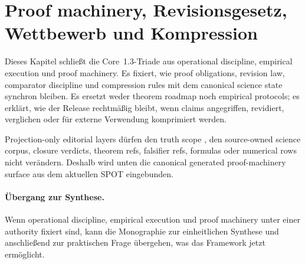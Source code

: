 \section{Proof machinery, Revisionsgesetz, Wettbewerb und Kompression}
\label{sec:oc-core-1-3-proof-machinery-de}

Dieses Kapitel schließt die Core~1.3-Triade aus operational discipline,
empirical execution und proof machinery. Es fixiert, wie proof obligations,
revision law, comparator discipline und compression rules mit dem canonical
science state synchron bleiben. Es ersetzt weder theorem roadmap noch
empirical protocols; es erklärt, wie der Release rechtmäßig bleibt, wenn
claims angegriffen, revidiert, verglichen oder für externe Verwendung
komprimiert werden.

Projection-only editorial layers dürfen den truth scope
, den source-owned science corpus, closure
verdicts, theorem refs, falsifier refs, formulas oder numerical rows nicht
verändern. Deshalb wird unten die canonical generated proof-machinery surface
aus dem aktuellen SPOT eingebunden.



\paragraph{Übergang zur Synthese.}
Wenn operational discipline, empirical execution und proof machinery unter
einer authority fixiert sind, kann die Monographie zur einheitlichen Synthese
und anschließend zur praktischen Frage übergehen, was das Framework jetzt
ermöglicht.
